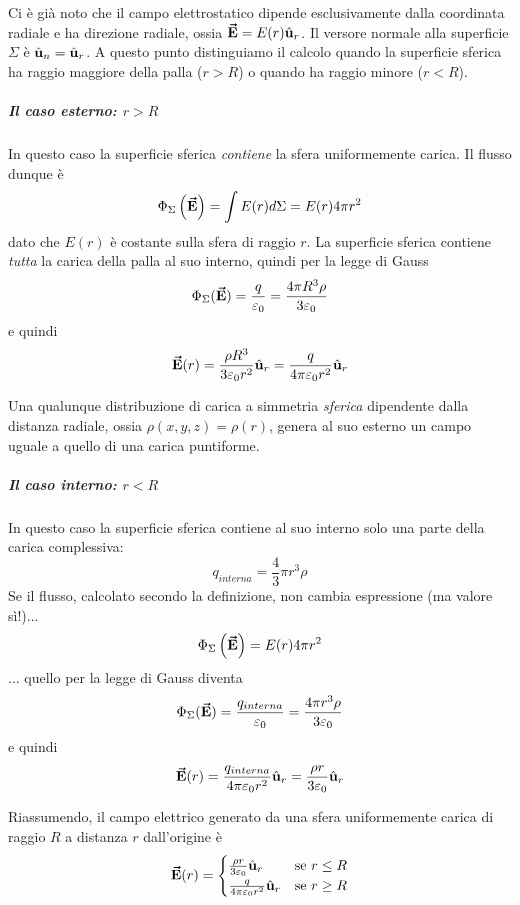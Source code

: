 Ci è già noto che il campo elettrostatico dipende esclusivamente dalla coordinata radiale e ha direzione radiale, ossia $\vb*{\va{E}}=E(r)\hat{\mathbf{u}}_r$. Il versore normale alla superficie $\Sigma$ è $\hat{\mathbf{u}}_n=\hat{\mathbf{u}}_r$.
A questo punto distinguiamo il calcolo quando la superficie sferica ha raggio maggiore della palla ($r>R$) o quando ha raggio minore ($r<R$).
\subparagraph{Il caso esterno: $r>R$}
In questo caso la superficie sferica \textit{contiene} la sfera uniformemente carica. Il flusso dunque è
\begin{equation*}
	\Phi_{\Sigma}\left(\vb*{\va{E}}\right)=\int E(r)d\Sigma=E(r)4\pi r^2
\end{equation*}
dato che $E(r)$ è costante sulla sfera di raggio $r$.
La superficie sferica contiene \textit{tutta} la carica della palla al suo interno, quindi per la legge di Gauss
\begin{equation*}
	\Phi_{\Sigma}(\vb*{\va{E}})=\frac{q}{\varepsilon_0}=\frac{4 \pi R^3\rho}{3\varepsilon_0}
\end{equation*}
e quindi
\begin{equation}
	\vb*{\va{E}}(r)=\frac{\rho R^3}{3\varepsilon_0r^2}\hat{\mathbf{u}}_r=\frac{q}{4\pi\varepsilon_0 r^2}\hat{\mathbf{u}}_r
\end{equation}
\begin{observe}
	Una qualunque distribuzione di carica a simmetria \textit{sferica} dipendente dalla distanza radiale, ossia $\rho(x,y,z)=\rho(r)$, genera al suo esterno un campo uguale a quello di una carica puntiforme.
\end{observe}
\subparagraph{Il caso interno: $r<R$}
In questo caso la superficie sferica contiene al suo interno solo una parte della carica complessiva:
\begin{equation*}
	q_{interna}=\frac{4}{3}\pi r^3\rho
\end{equation*}
Se il flusso, calcolato secondo la definizione, non cambia espressione (ma valore sì!)...
\begin{equation*}
	\Phi_{\Sigma}\left(\vb*{\va{E}}\right)=E(r)4\pi r^2
\end{equation*}
... quello per la legge di Gauss diventa
\begin{equation*}
	\Phi_{\Sigma}(\vb*{\va{E}})=\frac{q_{interna}}{\varepsilon_0}=\frac{4 \pi r^3\rho}{3\varepsilon_0}
\end{equation*}
e quindi
\begin{equation}
\vb*{\va{E}}(r)=\frac{q_{interna}}{4\pi\varepsilon_0 r^2}\hat{\mathbf{u}}_r=\frac{\rho r}{3\varepsilon_0}\hat{\mathbf{u}}_r
\end{equation}

Riassumendo, il campo elettrico generato da una sfera uniformemente carica di raggio $R$ a distanza $r$ dall'origine è
\begin{equation}
	\vb*{\va{E}}(r)=\begin{cases}
		\frac{\rho r}{3\varepsilon_0}\hat{\mathbf{u}}_r&\text{se}\ r\leq R\\
		\frac{q}{4\pi\varepsilon_0 r^2}\hat{\mathbf{u}}_r &\text{se}\ r\geq R
	\end{cases}
\end{equation}